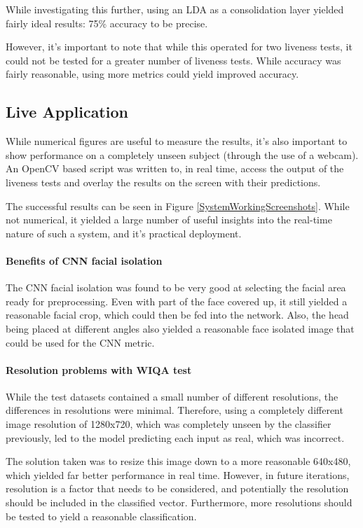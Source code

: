\documentclass[10pt,a4paper]{article}
\begin{document}
        While investigating this further, using an LDA as a consolidation layer yielded fairly ideal results: 75\% accuracy to be precise. 

        However, it's important to note that while this operated for two liveness tests, it could not be tested for a greater number of liveness tests. While accuracy was fairly reasonable,
        using more metrics could yield improved accuracy.

    \subsection{Live Application}
        While numerical figures are useful to measure the results, it's also important to show performance on a completely unseen subject (through the use of a webcam). An OpenCV based script was
        written to, in real time, access the output of the liveness tests and overlay the results on the screen with their predictions. 

        The successful results can be seen in Figure \ref{SystemWorkingScreenshots}. While not numerical, it yielded a large number of useful insights into the real-time nature of such a system,
        and it's practical deployment.

        \paragraph{Benefits of CNN facial isolation}
        The CNN facial isolation was found to be very good at selecting the facial area ready for preprocessing. Even with part of the face covered up, it still yielded a reasonable
        facial crop, which could then be fed into the network. Also, the head being placed at different angles also yielded a reasonable face isolated image that could be used for the
        CNN metric.
    
        \paragraph{Resolution problems with WIQA test}
            While the test datasets contained a small number of different resolutions, the differences in resolutions were minimal. Therefore, using a completely different image resolution
            of 1280x720, which was completely unseen by the classifier previously, led to the model predicting each input as real, which was incorrect.

            The solution taken was to resize this image down to a more reasonable 640x480, which yielded far better performance in real time. However, in future iterations, resolution is
            a factor that needs to be considered, and potentially the resolution should be included in the classified vector. Furthermore, more resolutions should be tested to yield a reasonable
            classification.
\end{document}
